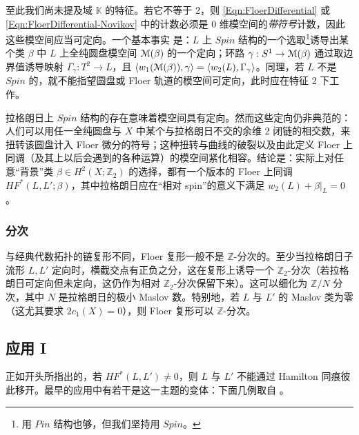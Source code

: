 \documentclass[11pt,a4paper]{article}
\numberwithin{equation}{section}
\newcommand{\bZ}{\mathbb{Z}}
\newcommand{\bK}{\mathbb{K}}
\newcommand{\scrM}{\EuScript{M}}
\begin{document}
至此我们尚未提及域 $\bK$ 的特征。若它不等于 2，则 \eqref{Eqn:FloerDifferential} 或 \eqref{Eqn:FloerDifferential-Novikov} 中的计数必须是 0 维模空间的\emph{带符号}计数，因此这些模空间应当可定向。一个基本事实 \cite{deSilva,FO3} 是：$L$ 上 $Spin$ 结构的一个选取\footnote{用 $Pin$ 结构也够，但我们坚持用 $Spin$。}诱导出某个类 $\beta$ 中 $L$ 上全纯圆盘模空间 $\scrM(\beta)$ 的一个定向；环路 $\gamma: S^1 \rightarrow \scrM(\beta)$ 通过取边界值诱导映射 $\Gamma_{\gamma}: T^2 \rightarrow L$，且 $\langle w_1(\scrM(\beta)), \gamma\rangle = \langle w_2(L), \Gamma_{\gamma}\rangle$。同理，若 $L$ 不是 $Spin$ 的，就不能指望圆盘或 Floer 轨道的模空间可定向，此时应在特征 2 下工作。

拉格朗日上 $Spin$ 结构的存在意味着模空间具有定向。然而这些定向仍非典范的：人们可以用任一全纯圆盘与 $X$ 中某个与拉格朗日不交的余维 2 闭链的相交数，来扭转该圆盘计入 Floer 微分的符号；这种扭转与曲线的破裂以及由此定义 Floer 上同调（及其上以后会遇到的各种运算）的模空间紧化相容。结论是：实际上对任意“背景”类 $\beta \in H^2(X;\bZ_2)$ 的选择，都有一个版本的 Floer 上同调 $HF^*(L,L';\beta)$，其中拉格朗日应在“相对 spin”的意义下满足 $w_2(L) + \beta|_L = 0$。

\subsubsection{分次} 与经典代数拓扑的链复形不同，Floer 复形一般不是 $\bZ$-分次的。至少当拉格朗日子流形 $L, L'$ 定向时，横截交点有正负之分，这在复形上诱导一个 $\bZ_2$-分次（若拉格朗日可定向但未定向，这仍作为相对 $\bZ_2$-分次保留下来）。这可以细化为 $\bZ/N$ 分次，其中 $N$ 是拉格朗日的极小 Maslov 数。特别地，若 $L$ 与 $L'$ 的 Maslov 类为零（这尤其要求 $2c_1(X)=0$），则 Floer 复形可以 $\bZ$-分次。

\subsection{应用 I}\label{Sec:Appl1} 正如开头所指出的，若 $HF^*(L,L') \neq 0$，则 $L$ 与 $L'$ 不能通过 Hamilton 同痕彼此移开。最早的应用中有若干是这一主题的变体：下面几例取自 \cite{Lalonde-Sikorav, FSS2, Polterovich}。
\end{document}
